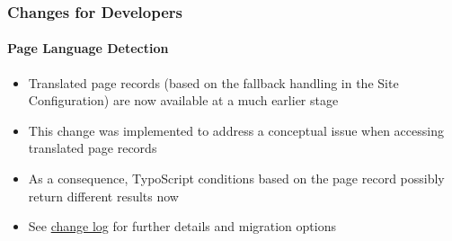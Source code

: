 %

\begin{frame}[fragile]
	\frametitle{Changes for Developers}
	\framesubtitle{Page Language Detection}


	\begin{itemize}
		\item Translated page records (based on the fallback handling in the Site
			Configuration) are now available at a much earlier stage
		\item This change was implemented to address a conceptual issue when
			accessing translated page records
		\item As a consequence, TypoScript conditions based on the page record
			possibly return different results now
		\item See \href{https://docs.typo3.org/c/typo3/cms-core/master/en-us/Changelog/11.0/Breaking-23736-PageLanguageDetectionSetEarlierInFrontendRequestProcess.html}{change log}
			for further details and migration options
	\end{itemize}

\end{frame}


